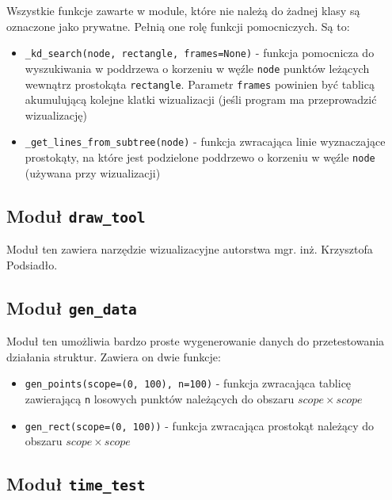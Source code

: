 \documentclass{article}
\begin{document}
Wszystkie funkcje zawarte w module, które nie należą do żadnej klasy są oznaczone jako prywatne. Pełnią one rolę funkcji pomocniczych. Są to:
\begin{itemize}
    \item \texttt{\_kd\_search(node, rectangle, frames=None)} - funkcja pomocnicza do wyszukiwania w poddrzewa o korzeniu w węźle \texttt{node} punktów leżących wewnątrz prostokąta \texttt{rectangle}. Parametr \texttt{frames} powinien być tablicą akumulującą kolejne klatki wizualizacji (jeśli program ma przeprowadzić wizualizację) 
    
    \item \texttt{\_get\_lines\_from\_subtree(node)} - funkcja zwracająca linie wyznaczające prostokąty, na które jest podzielone poddrzewo o korzeniu w węźle \texttt{node} (używana przy wizualizacji)
\end{itemize}

\subsection{Moduł \texttt{draw\_tool}}

Moduł ten zawiera narzędzie wizualizacyjne autorstwa mgr. inż. Krzysztofa Podsiadło.

\subsection{Moduł \texttt{gen\_data}}

Moduł ten umożliwia bardzo proste wygenerowanie danych do przetestowania działania struktur. Zawiera on dwie funkcje:
\begin{itemize}
    \item \texttt{gen\_points(scope=(0, 100), n=100)} - funkcja zwracająca tablicę zawierającą \texttt{n} losowych punktów należących do obszaru $scope \times scope$
    
    \item \texttt{gen\_rect(scope=(0, 100))} - funkcja zwracająca prostokąt należący do obszaru $scope \times scope$
\end{itemize}

\subsection{Moduł \texttt{time\_test}}
\label{time_test}
\end{document}
